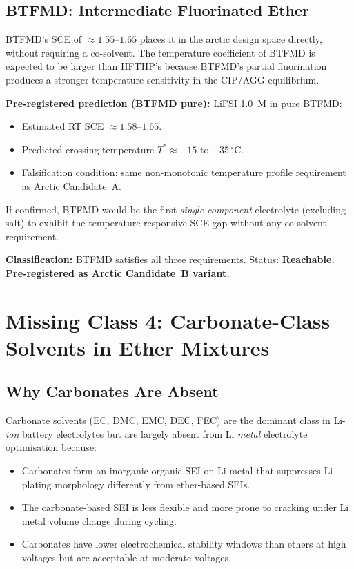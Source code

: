\documentclass[11pt]{article}
\theoremstyle{plain}
\theoremstyle{definition}
\theoremstyle{remark}
\begin{document}
\subsection{BTFMD: Intermediate Fluorinated Ether}

BTFMD's SCE of $\approx 1.55$--$1.65$ places it in the arctic
design space directly, without requiring a co-solvent.  The
temperature coefficient of BTFMD is expected to be larger than
HFTHP's because BTFMD's partial fluorination produces a
stronger temperature sensitivity in the CIP/AGG equilibrium.

\textbf{Pre-registered prediction (BTFMD pure):}
LiFSI 1.0~M in pure BTFMD:
\begin{itemize}[leftmargin=2em]
  \item Estimated RT SCE $\approx 1.58$--$1.65$.
  \item Predicted crossing temperature $T^{*} \approx -15$ to
        $-35\,^\circ$C.
  \item Falsification condition: same non-monotonic temperature
        profile requirement as Arctic Candidate~A.
\end{itemize}

If confirmed, BTFMD would be the first \emph{single-component}
electrolyte (excluding salt) to exhibit the temperature-responsive
SCE gap without any co-solvent requirement.

\textbf{Classification:} BTFMD satisfies all three requirements.
Status: \textbf{Reachable.  Pre-registered as Arctic Candidate~B
variant.}

\section{Missing Class 4: Carbonate-Class Solvents in Ether Mixtures}
\label{sec:carbonate}

\subsection{Why Carbonates Are Absent}

Carbonate solvents (EC, DMC, EMC, DEC, FEC) are the dominant
class in Li-\emph{ion} battery electrolytes but are largely
absent from Li \emph{metal} electrolyte optimisation because:
\begin{itemize}[leftmargin=2em]
  \item Carbonates form an inorganic-organic SEI on Li metal
        that suppresses Li plating morphology differently from
        ether-based SEIs.
  \item The carbonate-based SEI is less flexible and more prone
        to cracking under Li metal volume change during cycling.
  \item Carbonates have lower electrochemical stability windows
        than ethers at high voltages but are acceptable at
        moderate voltages.
\end{itemize}
\end{document}
